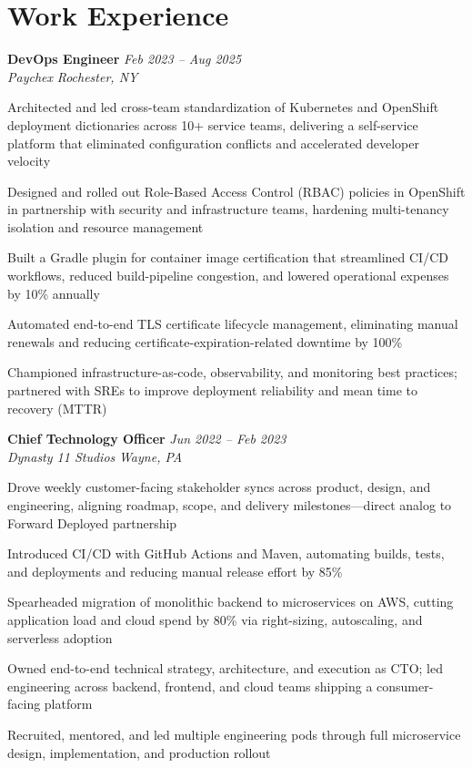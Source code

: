 \documentclass[letterpaper,10pt]{article}
\newcommand{\role}[4]{%
  \textbf{#1} \hfill \textit{#3}\\[-1pt]
  \textit{#2} \hfill \textit{#4}\par\vspace{2pt}
}
\begin{document}
\section*{Work Experience}
\role{DevOps Engineer}{Paychex}{Feb 2023 -- Aug 2025}{Rochester, NY}
\begin{tightitemize}
  \item Architected and led cross-team standardization of Kubernetes and OpenShift deployment dictionaries across 10+ service teams, delivering a self-service platform that eliminated configuration conflicts and accelerated developer velocity
  \item Designed and rolled out Role-Based Access Control (RBAC) policies in OpenShift in partnership with security and infrastructure teams, hardening multi-tenancy isolation and resource management
  \item Built a Gradle plugin for container image certification that streamlined CI/CD workflows, reduced build-pipeline congestion, and lowered operational expenses by 10\% annually
  \item Automated end-to-end TLS certificate lifecycle management, eliminating manual renewals and reducing certificate-expiration-related downtime by 100\%
  \item Championed infrastructure-as-code, observability, and monitoring best practices; partnered with SREs to improve deployment reliability and mean time to recovery (MTTR)
\end{tightitemize}

\role{Chief Technology Officer}{Dynasty 11 Studios}{Jun 2022 -- Feb 2023}{Wayne, PA}
\begin{tightitemize}
  \item Drove weekly customer-facing stakeholder syncs across product, design, and engineering, aligning roadmap, scope, and delivery milestones---direct analog to Forward Deployed partnership
  \item Introduced CI/CD with GitHub Actions and Maven, automating builds, tests, and deployments and reducing manual release effort by 85\%
  \item Spearheaded migration of monolithic backend to microservices on AWS, cutting application load and cloud spend by 80\% via right-sizing, autoscaling, and serverless adoption
  \item Owned end-to-end technical strategy, architecture, and execution as CTO; led engineering across backend, frontend, and cloud teams shipping a consumer-facing platform
  \item Recruited, mentored, and led multiple engineering pods through full microservice design, implementation, and production rollout
\end{tightitemize}
\end{document}
